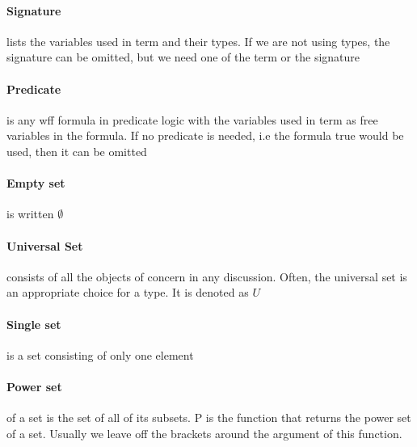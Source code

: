 \documentclass[12pt]{report}
\begin{document}
    \paragraph{Signature} lists the variables used in term and their types. If
    we are not using types, the signature can be omitted, but we need one of
    the term or the signature

    \paragraph{Predicate} is any wff formula in predicate logic with the
    variables used in term as free variables in the formula. If no predicate is
    needed, i.e the formula true would be used, then it can be omitted

    \paragraph{Empty set} is written $\emptyset$

    \paragraph{Universal Set} consists of all the objects of concern in any
    discussion. Often, the universal set is an appropriate choice for a type.
    It is denoted as $U$

    \paragraph{Single set} is a set consisting of only one element

    \paragraph{Power set} of a set is the set of all of its subsets. P is the
    function that returns the power set of a set. Usually we leave off the
    brackets around the argument of this function.
\end{document}
